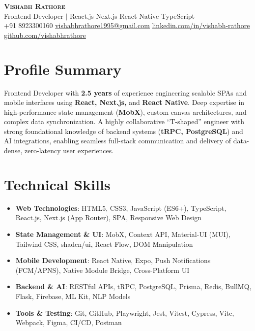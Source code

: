 \documentclass[letterpaper,10.5pt]{article}
\begin{document}
\begin{center}
    \textbf{\Huge \scshape Vishabh Rathore} \\ \vspace{2pt}
    \small Frontend Developer $|$ React.js \textperiodcentered{} Next.js \textperiodcentered{} React Native \textperiodcentered{} TypeScript \\ \vspace{2pt}
    \small
    +91 8923300160 \textperiodcentered{}
    \href{mailto:vishabhrathore1995@gmail.com}{\underline{vishabhrathore1995@gmail.com}} \textperiodcentered{}
    \href{https://www.linkedin.com/in/vishabh-rathore/}{\underline{linkedin.com/in/vishabh-rathore}} \textperiodcentered{}
    \href{https://github.com/vishabhrathore/}{\underline{github.com/vishabhrathore}}
\end{center}

\section{Profile Summary}
\small{
Frontend Developer with \textbf{2.5 years} of experience engineering scalable SPAs and mobile interfaces using \textbf{React, Next.js,} and \textbf{React Native}. Deep expertise in high-performance state management (\textbf{MobX}), custom canvas architectures, and complex data synchronization. A highly collaborative ``T-shaped'' engineer with strong foundational knowledge of backend systems (\textbf{tRPC, PostgreSQL}) and AI integrations, enabling seamless full-stack communication and delivery of data-dense, zero-latency user experiences.
}

\section{Technical Skills}
\begin{itemize}[leftmargin=0.15in, label={}, itemsep=0.25pt]
  \item \small{\textbf{Web Technologies}{: HTML5, CSS3, JavaScript (ES6+), TypeScript, React.js, Next.js (App Router), SPA, Responsive Web Design}}
  \item \small{\textbf{State Management \& UI}{: MobX, Context API, Material-UI (MUI), Tailwind CSS, shadcn/ui, React Flow, DOM Manipulation}}
  \item \small{\textbf{Mobile Development}{: React Native, Expo, Push Notifications (FCM/APNS), Native Module Bridge, Cross-Platform UI}}
  \item \small{\textbf{Backend \& AI}{: RESTful APIs, tRPC, PostgreSQL, Prisma, Redis, BullMQ, Flask, Firebase, ML Kit, NLP Models}}
  \item \small{\textbf{Tools \& Testing}{: Git, GitHub, Playwright, Jest, Vitest, Cypress, Vite, Webpack, Figma, CI/CD, Postman}}
\end{itemize}
\end{document}
